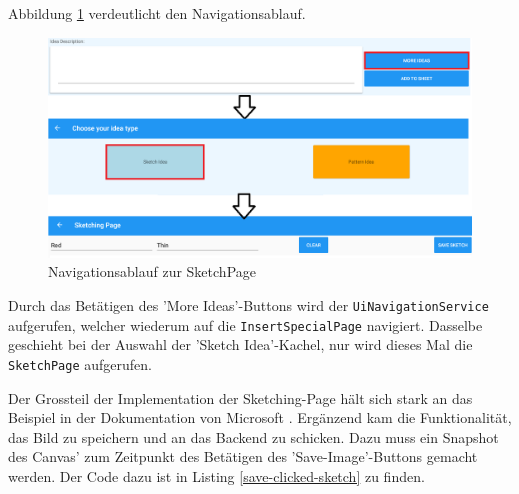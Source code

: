 Abbildung \ref{fig:sketch-page} verdeutlicht den Navigationsablauf.

\begin{figure}[h]
	\centering
	\includegraphics[width=1\linewidth]{img/techn-bericht/sketch-page}
	\caption{Navigationsablauf zur SketchPage}
	\label{fig:sketch-page}
\end{figure}

Durch das Betätigen des 'More Ideas'-Buttons wird der \texttt{UiNavigationService} aufgerufen, welcher wiederum auf die \texttt{InsertSpecialPage} navigiert. Dasselbe geschieht bei der Auswahl der 'Sketch Idea'-Kachel, nur wird dieses Mal die  \texttt{SketchPage} aufgerufen. 

Der Grossteil der Implementation der Sketching-Page hält sich stark an das Beispiel in der Dokumentation von Microsoft \cite{sketching-xf}. Ergänzend kam die Funktionalität, das Bild zu speichern und an das Backend zu schicken. Dazu muss ein Snapshot des Canvas' zum Zeitpunkt des Betätigen des 'Save-Image'-Buttons gemacht werden. Der Code dazu ist in Listing \ref{save-clicked-sketch} zu finden.

